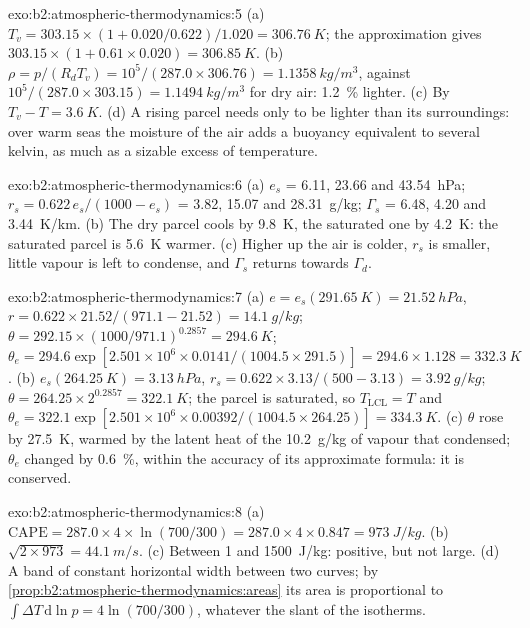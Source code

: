 \begin{solution}{exo:b2:atmospheric-thermodynamics:5}
(a) $T_v = 303.15 \times (1 + 0.020/0.622)/1.020 = \qty{306.76}{K}$; the approximation gives
$303.15 \times (1 + 0.61 \times 0.020) = \qty{306.85}{K}$. (b) $\rho = p/(R_dT_v) = 10^5/(287.0
\times 306.76) = \qty{1.1358}{kg/m^3}$, against $10^5/(287.0 \times 303.15) =
\qty{1.1494}{kg/m^3}$ for dry air: \qty{1.2}{\percent} lighter. (c) By $T_v - T =
\qty{3.6}{K}$. (d) A rising parcel needs only to be lighter than its surroundings: over warm seas
the moisture of the air adds a buoyancy equivalent to several kelvin, as much as a sizable
excess of temperature.
\end{solution}

\begin{solution}{exo:b2:atmospheric-thermodynamics:6}
(a) $e_s$ = 6.11, 23.66 and \qty{43.54}{hPa}; $r_s = 0.622\,e_s/(1000 - e_s)$ = 3.82, 15.07 and
\qty{28.31}{g/kg}; $\Gamma_s$ = 6.48, 4.20 and \qty{3.44}{K/km}. (b) The dry parcel cools by
\qty{9.8}{K}, the saturated one by \qty{4.2}{K}: the saturated parcel is \qty{5.6}{K} warmer.
(c) Higher up the air is colder, $r_s$ is smaller, little vapour is left to condense, and
$\Gamma_s$ returns towards $\Gamma_d$.
\end{solution}

\begin{solution}{exo:b2:atmospheric-thermodynamics:7}
(a) $e = e_s(\qty{291.65}{K}) = \qty{21.52}{hPa}$, $r = 0.622 \times 21.52/(971.1 - 21.52) =
\qty{14.1}{g/kg}$; $\theta = 292.15 \times (1000/971.1)^{0.2857} = \qty{294.6}{K}$; $\theta_e =
294.6 \exp[2.501 \times 10^6 \times 0.0141/(1004.5 \times 291.5)] = 294.6 \times 1.128 =
\qty{332.3}{K}$. (b) $e_s(\qty{264.25}{K}) = \qty{3.13}{hPa}$, $r_s = 0.622 \times 3.13/(500 -
3.13) = \qty{3.92}{g/kg}$; $\theta = 264.25 \times 2^{0.2857} = \qty{322.1}{K}$; the parcel is
saturated, so $T_{\text{LCL}} = T$ and $\theta_e = 322.1 \exp[2.501 \times 10^6 \times
0.00392/(1004.5 \times 264.25)] = \qty{334.3}{K}$. (c) $\theta$ rose by \qty{27.5}{K}, warmed
by the latent heat of the \qty{10.2}{g/kg} of vapour that condensed; $\theta_e$ changed by
\qty{0.6}{\percent}, within the accuracy of its approximate formula: it is conserved.
\end{solution}

\begin{solution}{exo:b2:atmospheric-thermodynamics:8}
(a) $\text{CAPE} = 287.0 \times 4 \times \ln(700/300) = 287.0 \times 4 \times 0.847 =
\qty{973}{J/kg}$. (b) $\sqrt{2 \times 973} = \qty{44.1}{m/s}$. (c) Between 1 and
\qty{1500}{J/kg}: positive, but not large. (d) A band of constant horizontal width between two
curves; by \cref{prop:b2:atmospheric-thermodynamics:areas} its area is proportional to $\int
\Delta T\,\mathrm{d}\ln p = 4 \ln(700/300)$, whatever the slant of the isotherms.
\end{solution}

